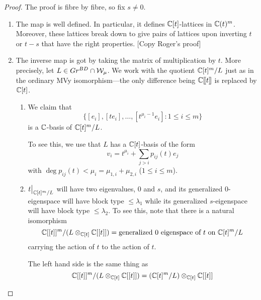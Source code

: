 \documentclass[draft]{article}
\begin{document}
\begin{proof}
    The proof is fibre by fibre, so fix $s\ne 0$. 
    \begin{enumerate}
        \item The map is well defined. In particular, it defines $\mathbb C[t]$-lattices in $\mathbb C(t)^m$. Moreover, these lattices break down to give pairs of lattices upon inverting $t$ or $t-s$ that have the right properties. [Copy Roger's proof]
        \item The inverse map is got by taking the matrix of multiplication by $t$.  More precisely, let $ L \in Gr^{BD} \cap \mathcal W_\mu$.  We work with the quotient $\mathbb C[t]^m/L$ just as in the ordinary MVy isomorphism---the only difference being $\mathbb C[\hspace{-.12em}[ {t} ]\hspace{-.12em}]$ is replaced by $\mathbb C[t]$.
\begin{enumerate}
    \item 
    We claim that 
    \begin{equation}
        \{[e_i],[te_i],\dots,[t^{\mu_{i}-1}e_i] : 1\le i \le m\}
    \end{equation}
    is a $\mathbb C$-basis of $\mathbb C[t]^m/L$.
    
    To see this, we use that $ L $ 
 has a $\mathbb C[t]$-basis of the form 
    \begin{equation}
        v_i = t^{\mu_i} + \sum_{j>i} p_{ij}(t) e_j 
    \end{equation}
    with $\deg p_{ij}(t) < \mu_i = \mu_{1,i} + \mu_{2,i}$ ($1\le i\le m$).
    \item $t\big|_{\mathbb C[t]^m/L}$ will have two eigenvalues, 0 and $s$, and its generalized 0-eigenspace will have block type $\le \lambda_1$ while its generalized $s$-eigenspace will have block type $\le \lambda_2$. 
    To see this, note that there is a natural isomorphism
    $$\mathbb C[[t]]^m/(L \otimes_{\mathbb C[t]} \mathbb C[[t]]) = \text{generalized $0$ eigenspace of $t$ on } \mathbb C[t]^m/L$$
    carrying the action of $t $ to the action of $t$.
    
    The left hand side is the same thing as
    $$ \mathbb C[[t]]^m / (L \otimes_{\mathbb C[t]} \mathbb C[[t]]) = (\mathbb C[t]^m/L) \otimes_{\mathbb C[t]} \mathbb C[[t]] $$
    

\end{enumerate}
\end{enumerate}
\end{proof}
\end{document}
